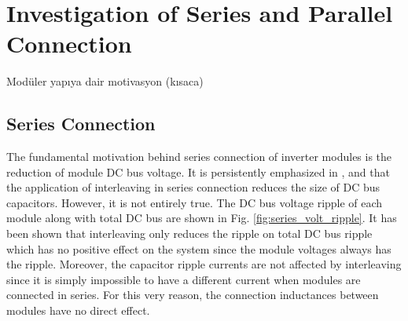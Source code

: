 \section{Investigation of Series and Parallel Connection}\label{sec:SimResults}

Modüler yapıya dair motivasyon (kısaca) %

\subsection{Series Connection}
The fundamental motivation behind series connection of inverter modules is the reduction of module DC bus voltage. It is persistently emphasized in \cite{Wang2013}, \cite{Zlwka} and \cite{Wang2015b} that the application of interleaving in series connection reduces the size of DC bus capacitors. However, it is not entirely true. The DC bus voltage ripple of each module along with total DC bus are shown in Fig. \ref{fig:series_volt_ripple}. It has been shown that interleaving only reduces the ripple on total DC bus ripple which has no positive effect on the system since the module voltages always has the ripple. Moreover, the capacitor ripple currents are not affected by interleaving since it is simply impossible to have a different current when modules are connected in series. For this very reason, the connection inductances between modules have no direct effect.


